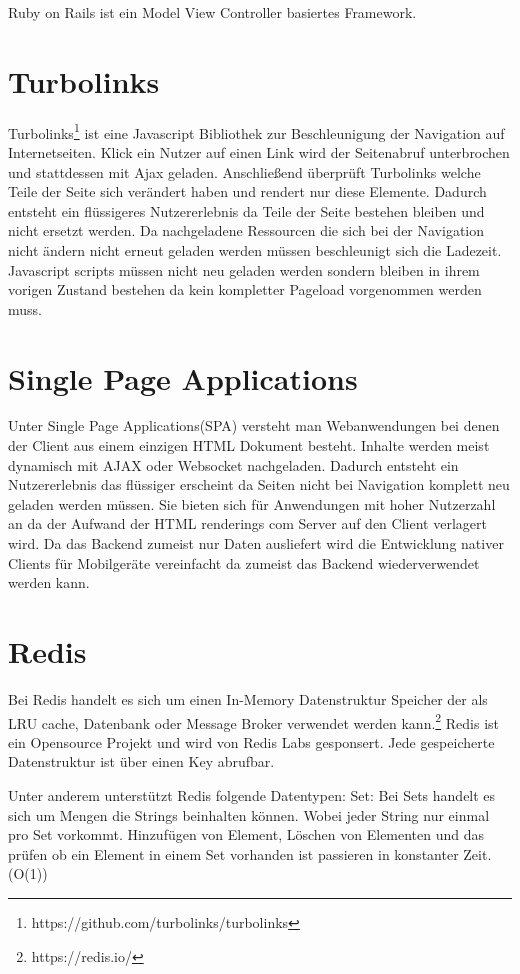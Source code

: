 Ruby on Rails ist ein Model View Controller basiertes Framework.

\section{Turbolinks}
Turbolinks\footnote{https://github.com/turbolinks/turbolinks} ist eine Javascript Bibliothek zur Beschleunigung der Navigation auf Internetseiten. Klick ein Nutzer auf einen Link wird der Seitenabruf unterbrochen und stattdessen mit Ajax geladen. Anschließend überprüft Turbolinks welche Teile der Seite sich verändert haben und rendert nur diese Elemente. Dadurch entsteht ein flüssigeres Nutzererlebnis da Teile der Seite bestehen bleiben und nicht ersetzt werden. Da nachgeladene Ressourcen die sich bei der Navigation nicht ändern nicht erneut geladen werden müssen beschleunigt sich die Ladezeit. Javascript scripts müssen nicht neu geladen werden sondern bleiben in ihrem vorigen Zustand bestehen da kein kompletter Pageload vorgenommen werden muss.

\section{Single Page Applications}

Unter Single Page Applications(SPA) versteht man Webanwendungen bei denen der Client aus einem einzigen HTML Dokument besteht.\cite{spa-def} Inhalte werden meist dynamisch mit AJAX oder Websocket nachgeladen. Dadurch entsteht ein Nutzererlebnis das flüssiger erscheint da Seiten nicht bei Navigation komplett neu geladen werden müssen. Sie bieten sich für Anwendungen mit hoher Nutzerzahl an da der Aufwand der HTML renderings com Server auf den Client verlagert wird. Da das Backend zumeist nur Daten ausliefert wird die Entwicklung nativer Clients für Mobilgeräte vereinfacht da zumeist das Backend wiederverwendet werden kann.

\section{Redis}
Bei Redis handelt es sich um einen In-Memory Datenstruktur Speicher der als LRU cache, Datenbank oder Message Broker verwendet werden kann.\footnote{https://redis.io/} Redis ist ein Opensource Projekt und  wird von Redis Labs gesponsert. Jede gespeicherte Datenstruktur ist über einen Key abrufbar.

Unter anderem unterstützt Redis folgende Datentypen:
Set:
Bei Sets handelt es sich um Mengen die Strings beinhalten können. Wobei jeder String nur einmal pro Set vorkommt. Hinzufügen von Element, Löschen von Elementen und das prüfen ob ein Element in einem Set vorhanden ist passieren in konstanter Zeit. (O(1))

